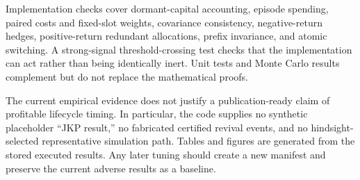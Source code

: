 Implementation checks cover dormant-capital accounting, episode spending, paired costs and fixed-slot weights, covariance consistency, negative-return hedges, positive-return redundant allocations, prefix invariance, and atomic switching. A strong-signal threshold-crossing test checks that the implementation can act rather than being identically inert. Unit tests and Monte Carlo results complement but do not replace the mathematical proofs.

The current empirical evidence does not justify a publication-ready claim of profitable lifecycle timing. In particular, the code supplies no synthetic placeholder ``JKP result,'' no fabricated certified revival events, and no hindsight-selected representative simulation path. Tables and figures are generated from the stored executed results. Any later tuning should create a new manifest and preserve the current adverse results as a baseline.
